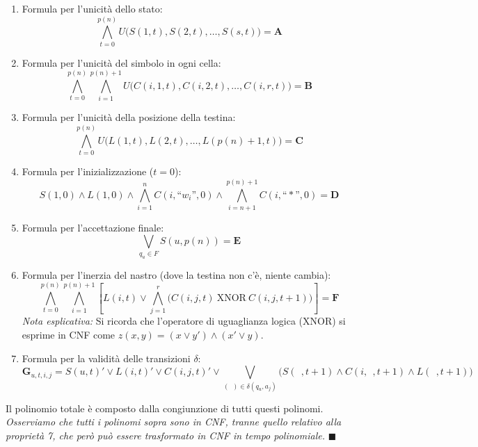 \begin{enumerate}
    \item[1)] Formula per l'unicità dello stato:
    $$ \bigwedge_{t=0}^{p(n)} U\Big(S(1, t), S(2, t), \dots, S(s, t)\Big) = \mathbf{A} $$

    \item[2)] Formula per l'unicità del simbolo in ogni cella:
    $$ \bigwedge_{t=0}^{p(n)} \bigwedge_{i=1}^{p(n)+1} U\Big(C(i, 1, t), C(i, 2, t), \dots, C(i, r, t)\Big) = \mathbf{B} $$

    \item[3)] Formula per l'unicità della posizione della testina:
    $$ \bigwedge_{t=0}^{p(n)} U\Big(L(1, t), L(2, t), \dots, L(p(n)+1, t)\Big) = \mathbf{C} $$

    \item[4)] Formula per l'inizializzazione ($t=0$):
    $$ S(1, 0) \land L(1, 0) \land \bigwedge_{i=1}^n C(i, \text{``}w_i\text{''}, 0) \land \bigwedge_{i=n+1}^{p(n)+1} C(i, \text{``}\ast\text{''}, 0) = \mathbf{D} $$

    \item[5)] Formula per l'accettazione finale:
    $$ \bigvee_{q_u \in F} S(u, p(n)) = \mathbf{E} $$

    \item[6)] Formula per l'inerzia del nastro (dove la testina non c'è, niente cambia):
    $$ \bigwedge_{t=0}^{p(n)} \bigwedge_{i=1}^{p(n)+1} \left[ L(i, t) \lor \bigwedge_{j=1}^r \Big( C(i, j, t) \ \text{XNOR} \ C(i, j, t+1) \Big) \right] = \mathbf{F} $$
    \textit{Nota esplicativa:} Si ricorda che l'operatore di uguaglianza logica (XNOR) si esprime in CNF come $z(x,y) = (x \lor y') \land (x' \lor y)$.

    \item[7)] Formula per la validità delle transizioni $\delta$:
    $$ \mathbf{G}_{u, t, i, j} = S(u, t)' \lor L(i, t)' \lor C(i, j, t)' \lor \bigvee_{( \ \ ) \in \delta(q_u, a_j)} \Big( S(\ \ , t+1) \land C(i, \ \ , t+1) \land L(\ \ , t+1) \Big) $$
\end{enumerate}

\vspace{0.4cm}
Il polinomio totale è composto dalla congiunzione di tutti questi polinomi. \\
\textit{Osserviamo che tutti i polinomi sopra sono in CNF, tranne quello relativo alla proprietà 7, che però può essere trasformato in CNF in tempo polinomiale.} \hfill $\blacksquare$













